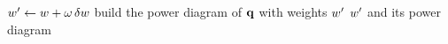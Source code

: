 \documentclass[main.tex]{subfiles}
\begin{document}
\begin{algorithm}[H]
  \caption{Backtracking line search on $\dualenergy$.}
  \label{alg:line-search}
  \begin{algorithmic}[1]
    \Require {}
      \State $w' \gets w + \omega\,\delta w$
      \State build the power diagram of $\mathbf{q}$ with weights $w'$
        \State \Return $w'$ and its power diagram
      \EndIf
    \EndFor
  \end{algorithmic}
\end{algorithm}
\end{document}
